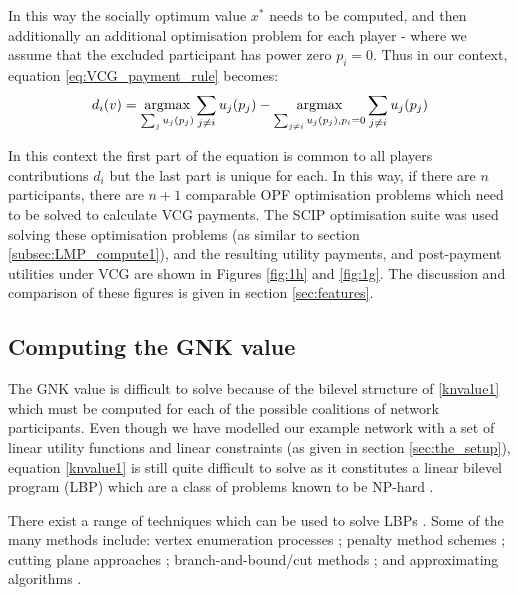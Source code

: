 In this way the socially optimum value $x^*$ needs to be computed, and then additionally an additional optimisation problem for each player - where we assume that the excluded participant has power zero $p_i=0$. Thus in our context, equation \ref{eq:VCG_payment_rule} becomes:
\begin{equation*} d_i(v)=\operatorname*{\arg\!\max}_{\sum_{j} u_j(p_j)}\sum_{j\ne i}u_j(p_j) - \operatorname*{\arg\!\max}_{\sum_{j\ne i} u_j(p_j), p_i=0}\sum_{j\ne i}u_j(p_j)\end{equation*}

In this context the first part of the equation is common to all players contributions $d_i$ but the last part is unique for each.
In this way, if there are $n$ participants, there are $n+1$ comparable OPF optimisation problems which need to be solved to calculate VCG payments.
The SCIP optimisation suite was used solving these optimisation problems (as similar to section \ref{subsec:LMP_compute1}), and the resulting utility payments, and post-payment utilities under VCG are shown in Figures \ref{fig:1h} and \ref{fig:1g}.
The discussion and comparison of these figures is given in section \ref{sec:features}.


\subsection{Computing the GNK value}\label{subsec:gnk_compute1}

The GNK value is difficult to solve because of the bilevel structure of \eqref{knvalue1} which must be computed for each of the possible coalitions of network participants.
Even though we have modelled our example network with a set of linear utility functions and linear constraints (as given in section \ref{sec:the_setup}), equation \eqref{knvalue1} is still quite difficult to solve as it constitutes a linear bilevel program (LBP) which are a class of problems known to be NP-hard \cite{DBLP:journals/tec/SinhaMD18,Ben-Ayed:1990:CDB}.

There exist a range of techniques which can be used to solve LBPs \cite{DBLP:journals/tec/SinhaMD18,S.Dempe.Optimisations}.
Some of the many methods include: vertex enumeration processes \cite{Bialas:1984:TLP:2784019.2784026,Shi:2005:EKA:2641854.2642183,LIU1995644}; penalty method schemes \cite{KleinertSchmidt2019,ONAL1993126,dempe_optimisation111};
cutting plane approaches \cite{cuttingplane1};
branch-and-bound/cut methods \cite{SHI200551,Hansen:1992:NBR:141164.141181,Audet2007};
and approximating algorithms \cite{Pineda2018,rnnlbp1,genetic_algirthm_blp}.

